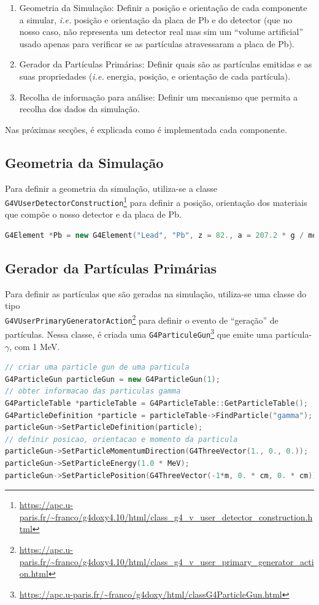 \documentclass[a4paper, 12pt]{article} %
\begin{document}
	\begin{enumerate}
		\item Geometria da Simulação: Definir a posição e orientação de cada componente a simular, \textit{i.e.} posição e orientação da placa de Pb e do detector (que no nosso caso, não representa um detector real mas sim um ``volume artificial'' usado apenas para verificar se as partículas atravessaram a placa de Pb).
		\item Gerador da Partículas Primárias: Definir quais são as partículas emitidas e as suas propriedades (\textit{i.e.} energia, posição, e orientação de cada partícula).
		\item Recolha de informação para análise: Definir um mecanismo que permita a recolha dos dados da simulação.
	\end{enumerate}

	Nas próximas secções, é explicada como é implementada cada componente.

	\subsection{Geometria da Simulação}
	Para definir a geometria da simulação, utiliza-se a classe \texttt{G4VUserDetectorConstruction}\footnote{\url{https://apc.u-paris.fr/~franco/g4doxy4.10/html/class_g4_v_user_detector_construction.html}} para definir a posição, orientação dos materiais que compõe o nosso detector e da placa de Pb.  

	\begin{lstlisting}[language=C++]
		G4Element *Pb = new G4Element("Lead", "Pb", z = 82., a = 207.2 * g / mole);
	\end{lstlisting}

	\subsection{Gerador da Partículas Primárias}
	Para definir as partículas que são geradas na simulação, utiliza-se uma classe do tipo \\\texttt{G4VUserPrimaryGeneratorAction}\footnote{\url{https://apc.u-paris.fr/~franco/g4doxy4.10/html/class_g4_v_user_primary_generator_action.html}} para definir o evento de ``geração'' de partículas. Nessa classe, é criada uma \texttt{G4ParticuleGun}\footnote{\url{https://apc.u-paris.fr/~franco/g4doxy/html/classG4ParticleGun.html}} que emite uma partícula-$\gamma$, com 1 MeV.


	\begin{lstlisting}[language=C++]
// criar uma particle gun de uma particula
G4ParticleGun particleGun = new G4ParticleGun(1);
// obter informacao das particulas gamma
G4ParticleTable *particleTable = G4ParticleTable::GetParticleTable();
G4ParticleDefinition *particle = particleTable->FindParticle("gamma");
particleGun->SetParticleDefinition(particle);
// definir posicao, orientacao e momento da particula
particleGun->SetParticleMomentumDirection(G4ThreeVector(1., 0., 0.));
particleGun->SetParticleEnergy(1.0 * MeV);
particleGun->SetParticlePosition(G4ThreeVector(-1*m, 0. * cm, 0. * cm));
	\end{lstlisting}
\end{document}
